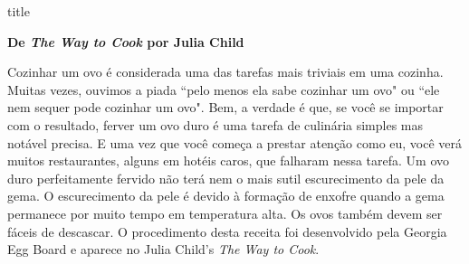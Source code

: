 \documentclass [11pt, letterpaper] {article}
\begin{document}
 {title}

\begin {flushright}
{\bf De {\it The Way to Cook} por Julia Child}
\end {flushright}
 
 Cozinhar um ovo é considerada uma das tarefas mais triviais em uma cozinha. Muitas vezes, ouvimos a piada ``pelo menos ela sabe cozinhar um ovo" ou ``ele nem sequer pode cozinhar um ovo". Bem, a verdade é que, se você se importar com o resultado, ferver um ovo duro é uma tarefa de culinária simples mas notável precisa. E uma vez que você começa a prestar atenção como eu, você verá muitos restaurantes, alguns em hotéis caros, que falharam nessa tarefa. Um ovo duro perfeitamente fervido não terá nem o mais sutil escurecimento da pele da gema. O escurecimento da pele é devido à formação de enxofre quando a gema permanece por muito tempo em temperatura alta. Os ovos tamb\'em devem ser f\'aceis de descascar. O procedimento desta receita foi desenvolvido pela Georgia Egg Board e aparece no Julia Child's {\it The Way to Cook}.
 
\end{document}
